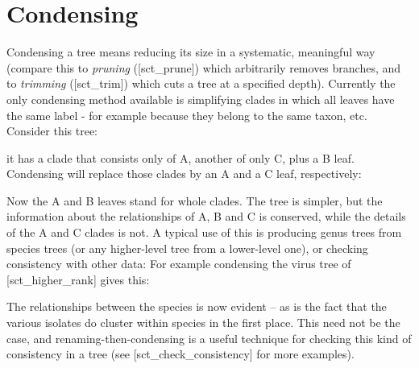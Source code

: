 
\section[sct_condense]{Condensing}


Condensing a tree means reducing its size in a systematic, meaningful way
(compare this to {\em pruning} (\in{}[sct_prune]) which arbitrarily removes
branches, and to {\em trimming} (\in{}[sct_trim]) which cuts a tree at a
specified depth). Currently the only condensing method available is
simplifying clades in which all leaves have the same label - for example
because they belong to the same taxon, etc. Consider this tree:


it has a clade that consists only of A, another of only C, plus a B
leaf.  Condensing will replace those clades by an A and a C leaf,
respectively:


Now the A and B leaves stand for whole clades. The tree is simpler,
but the information about the relationships of A, B and C is conserved, while
the details of the A and C clades is not.  A typical use of this is producing
genus trees from species trees (or any higher-level tree from a lower-level
one), or checking consistency with other data: For example condensing the virus
tree of [sct_higher_rank] gives this:


The relationships between the species is now evident -- as is the
fact that the various isolates do cluster within species in the first place.
This need not be the case, and renaming-then-condensing is a useful technique
for checking this kind of consistency in a tree (see
\in{}[sct_check_consistency] for more examples).
